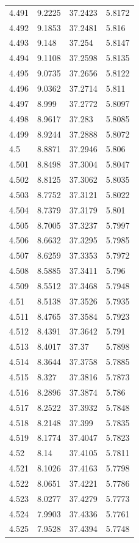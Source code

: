 \begin{tabular}{llll}
4.491 & 9.2225 & 37.2423 & 5.8172 \\
4.492 & 9.1853 & 37.2481 & 5.816 \\
4.493 & 9.148 & 37.254 & 5.8147 \\
4.494 & 9.1108 & 37.2598 & 5.8135 \\
4.495 & 9.0735 & 37.2656 & 5.8122 \\
4.496 & 9.0362 & 37.2714 & 5.811 \\
4.497 & 8.999 & 37.2772 & 5.8097 \\
4.498 & 8.9617 & 37.283 & 5.8085 \\
4.499 & 8.9244 & 37.2888 & 5.8072 \\
4.5 & 8.8871 & 37.2946 & 5.806 \\
4.501 & 8.8498 & 37.3004 & 5.8047 \\
4.502 & 8.8125 & 37.3062 & 5.8035 \\
4.503 & 8.7752 & 37.3121 & 5.8022 \\
4.504 & 8.7379 & 37.3179 & 5.801 \\
4.505 & 8.7005 & 37.3237 & 5.7997 \\
4.506 & 8.6632 & 37.3295 & 5.7985 \\
4.507 & 8.6259 & 37.3353 & 5.7972 \\
4.508 & 8.5885 & 37.3411 & 5.796 \\
4.509 & 8.5512 & 37.3468 & 5.7948 \\
4.51 & 8.5138 & 37.3526 & 5.7935 \\
4.511 & 8.4765 & 37.3584 & 5.7923 \\
4.512 & 8.4391 & 37.3642 & 5.791 \\
4.513 & 8.4017 & 37.37 & 5.7898 \\
4.514 & 8.3644 & 37.3758 & 5.7885 \\
4.515 & 8.327 & 37.3816 & 5.7873 \\
4.516 & 8.2896 & 37.3874 & 5.786 \\
4.517 & 8.2522 & 37.3932 & 5.7848 \\
4.518 & 8.2148 & 37.399 & 5.7835 \\
4.519 & 8.1774 & 37.4047 & 5.7823 \\
4.52 & 8.14 & 37.4105 & 5.7811 \\
4.521 & 8.1026 & 37.4163 & 5.7798 \\
4.522 & 8.0651 & 37.4221 & 5.7786 \\
4.523 & 8.0277 & 37.4279 & 5.7773 \\
4.524 & 7.9903 & 37.4336 & 5.7761 \\
4.525 & 7.9528 & 37.4394 & 5.7748 \\

\end{tabular}
